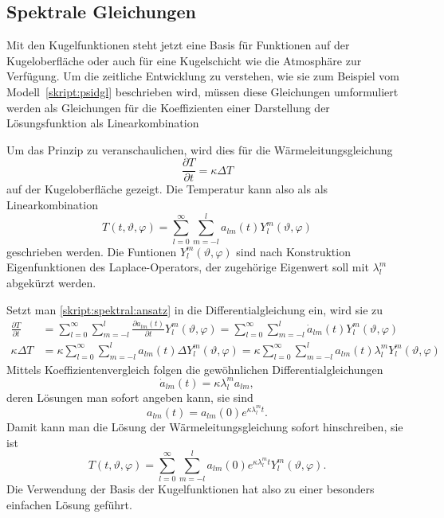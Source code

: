 %
%
%
\subsection{Spektrale Gleichungen\label{subsection:spektrale gleichungen}}
Mit den Kugelfunktionen steht jetzt eine Basis für Funktionen auf der
Kugeloberfläche oder auch für eine Kugelschicht wie die Atmosphäre zur
Verfügung.
Um die zeitliche Entwicklung zu verstehen, wie sie zum Beispiel vom
Modell~\eqref{skript:psidgl} beschrieben wird, müssen diese Gleichungen
umformuliert werden als Gleichungen für die Koeffizienten einer Darstellung
der Lösungsfunktion als Linearkombination 

Um das Prinzip zu veranschaulichen, wird dies für die Wärmeleitungsgleichung
\[
\frac{\partial T}{\partial t}
=
\kappa \Delta T
\]
auf der Kugeloberfläche gezeigt.
Die Temperatur kann also als als Linearkombination
\begin{equation}
T(t, \vartheta, \varphi)
=
\sum_{l=0}^\infty \sum_{m=-l}^{l} a_{lm}(t) Y^m_l(\vartheta,\varphi)
\label{skript:spektral:ansatz}
\end{equation}
geschrieben werden.
Die Funtionen $Y^m_l(\vartheta,\varphi)$ sind nach Konstruktion
Eigenfunktionen des Laplace-Operators, der zugehörige Eigenwert soll
mit $\lambda^m_l$ abgekürzt werden.

Setzt man \eqref{skript:spektral:ansatz} in die Differentialgleichung
ein, wird sie zu
\begin{align*}
\frac{\partial T}{\partial t}
&=
\sum_{l=0}^\infty \sum_{m=-l}^{l} \frac{\partial a_{lm}(t)}{\partial t} Y^m_l(\vartheta,\varphi)
=
\sum_{l=0}^\infty \sum_{m=-l}^{l} \dot a_{lm}(t) Y^m_l(\vartheta,\varphi)
\\
\kappa\Delta T
&=
\kappa
\sum_{l=0}^\infty \sum_{m=-l}^{l} a_{lm}(t) \Delta Y^m_l(\vartheta,\varphi)
=
\kappa
\sum_{l=0}^\infty \sum_{m=-l}^{l} a_{lm}(t) \lambda^m_l Y^m_l(\vartheta,\varphi)
\end{align*}
Mittels Koeffizientenvergleich folgen die gewöhnlichen
Differentialgleichungen
\[
\dot a_{lm}(t)
=
\kappa\lambda^m_l
a_{lm},
\]
deren Lösungen man sofort angeben kann, sie sind
\[
a_{lm}(t)
=
a_{lm}(0) e^{\kappa\lambda^m_l t}.
\]
Damit kann man die Lösung der Wärmeleitungsgleichung sofort hinschreiben,
sie ist
\begin{equation}
T(t,\vartheta,\varphi)
=
\sum_{l=0}^\infty \sum_{m=-l}^{l}
a_{lm}(0) e^{\kappa\lambda^m_l t}
Y^m_l(\vartheta,\varphi).
\end{equation}
Die Verwendung der Basis der Kugelfunktionen hat also zu einer besonders 
einfachen Lösung geführt.

